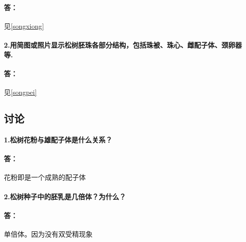 \documentclass[utf8]{ctexart}
\begin{document}
    \paragraph*{答：}见\ref{songxiong}
    \paragraph*{2.用简图或照片显示松树胚珠各部分结构，包括珠被、珠心、雌配子体、颈卵器等.}
    \paragraph*{答：}见\ref{songpei}
\subsection*{讨论}
    \paragraph*{1.松树花粉与雄配子体是什么关系？}
    \paragraph*{答：}花粉即是一个成熟的配子体
    \paragraph*{2.松树种子中的胚乳是几倍体？为什么？}
    \paragraph*{答：}单倍体。因为没有双受精现象
\end{document}
